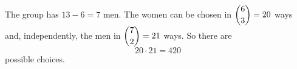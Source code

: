 The group has $13-6=7$ men. The women can be chosen in $\dbinom63=20$ ways and, independently, the men in $\dbinom72=21$ ways. So there are
\[
20\cdot21=\boxed{420}
\]
possible choices.

